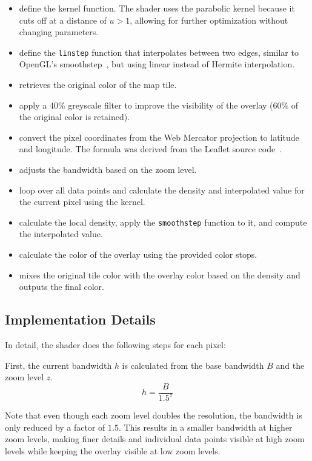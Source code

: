 \begin{itemize}
    \item {} define the kernel function. The shader uses the parabolic kernel because it cuts off at a distance of $u > 1$, allowing for further optimization without changing parameters.
    \item {} define the \verb|linstep| function that interpolates between two edges, similar to OpenGL's smoothstep\ \cite{opengl:esref}, but using linear instead of Hermite interpolation.
    \item {} retrieves the original color of the map tile.
    \item {} apply a 40\% greyscale filter to improve the visibility of the overlay (60\% of the original color is retained).
    \item {} convert the pixel coordinates from the Web Mercator projection to latitude and longitude. The formula was derived from the Leaflet source code\ \cite{leaflet:source}\@.
    \item {} adjusts the bandwidth based on the zoom level.
    \item {} loop over all data points and calculate the density and interpolated value for the current pixel using the kernel.
    \item {} calculate the local density, apply the \verb|smoothstep| function to it, and compute the interpolated value.
    \item {} calculate the color of the overlay using the provided color stops.
    \item {} mixes the original tile color with the overlay color based on the density and outputs the final color.
\end{itemize}

\subsection{Implementation Details}\label{subsec:shader_details}

In detail, the shader does the following steps for each pixel:

First, the current bandwidth $h$ is calculated from the base bandwidth $B$ and the zoom level $z$.
\[
h = \frac{B}{1.5^{z}}
\]

Note that even though each zoom level doubles the resolution, the bandwidth is only reduced by a factor of $1.5$. This results in a smaller bandwidth at higher zoom levels, making finer details and individual data points visible at high zoom levels while keeping the overlay visible at low zoom levels.

